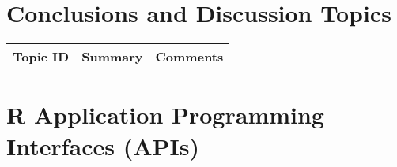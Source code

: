 \section{Conclusions and Discussion Topics}

\begin{table}[H]\centering
	\begin{tabular}{p{1cm}p{4cm}p{3cm}}
		Topic ID & Summary & Comments\\
		\hline
		\hline
	\end{tabular}
\end{table}


\section{R Application Programming Interfaces (APIs)}




